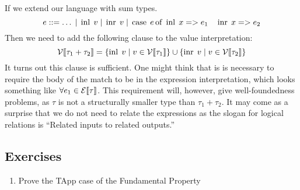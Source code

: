 If we extend our language with sum types. %
\[
e::= \dots \; | \; \operatorname{inl} \; v \; | \; \operatorname{inr} \; v \; | \; \operatorname{case} \; e \operatorname{of} \; \operatorname{inl} \; x => e_1 \quad \operatorname{inr} \; x => e_2
\]
Then we need to add the following clause to the value interpretation:
\[
  \mathcal{V}\llbracket \tau_1 + \tau_2 \rrbracket = \{\operatorname{inl} \; v \; | \; v \in \mathcal{V}\llbracket \tau_1 \rrbracket\} \cup
                           \{\operatorname{inr} \; v \; | \; v \in \mathcal{V}\llbracket \tau_2 \rrbracket\}
\]
It turns out this clause is sufficient. One might think that is is necessary to require the body of the match to be in the expression interpretation, which looks something like $\forall e_1 \in \mathcal{E}\llbracket \tau \rrbracket$. This requirement will, however, give well-foundedness problems, as $\tau$ is not a structurally smaller type than $\tau_1 + \tau_2$. It may come as a surprise that we do not need to relate the expressions as the slogan for logical relations is ``Related inputs to related outputs.''
\subsection*{Exercises}
\begin{enumerate}
\item Prove the TApp case of the Fundamental Property
\end{enumerate}
